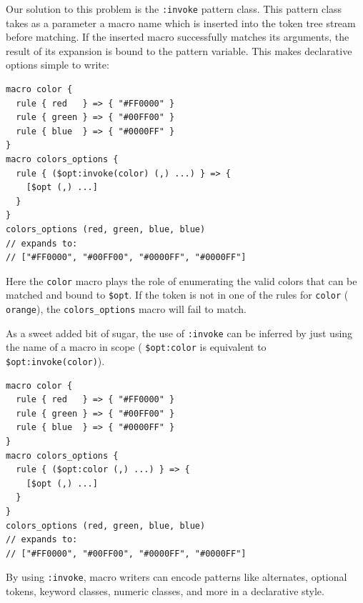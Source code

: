 \documentclass[9pt]{sigplanconf}
\begin{document}
Our solution to this problem is the \verb!:invoke! pattern class.
This pattern class takes as a parameter a macro name which is inserted
into the token tree stream before matching. If the inserted macro
successfully matches its arguments, the result of its expansion is
bound to the pattern variable. This makes declarative options simple
to write:
\begin{lstlisting}
macro color {
  rule { red   } => { "#FF0000" }
  rule { green } => { "#00FF00" }
  rule { blue  } => { "#0000FF" }
}
macro colors_options {
  rule { ($opt:invoke(color) (,) ...) } => { 
    [$opt (,) ...]
  }
}
colors_options (red, green, blue, blue)
// expands to:
// ["#FF0000", "#00FF00", "#0000FF", "#0000FF"]
\end{lstlisting}
Here the \verb!color! macro plays the role of enumerating the
valid colors that can be matched and bound to \verb!$opt!.
If the token is not in one of the rules for \verb!color! (\eg
\verb!orange!), the \verb!colors_options! macro will fail to match.

As a sweet added bit of sugar, the use of \verb!:invoke! can be
inferred by just using the name of a macro in scope (\ie
\verb!$opt:color! is equivalent to
\verb!$opt:invoke(color)!).

\begin{lstlisting}
macro color {
  rule { red   } => { "#FF0000" }
  rule { green } => { "#00FF00" }
  rule { blue  } => { "#0000FF" }
}
macro colors_options {
  rule { ($opt:color (,) ...) } => { 
    [$opt (,) ...]
  }
}
colors_options (red, green, blue, blue)
// expands to:
// ["#FF0000", "#00FF00", "#0000FF", "#0000FF"]
\end{lstlisting}

By using \verb!:invoke!, macro writers can encode patterns
like alternates, optional tokens, keyword classes, numeric classes,
and more in a declarative style.



\end{document}
